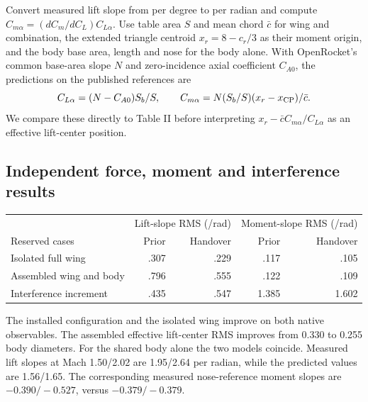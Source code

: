Convert measured lift slope from per degree to per radian and compute $C_{m\alpha}=(dC_m/dC_L)C_{L\alpha}$. Use table area $S$ and mean chord $\bar c$ for wing and combination, the extended triangle centroid $x_r=8-c_r/3$ as their moment origin, and the body base area, length and nose for the body alone. With OpenRocket's common base-area slope $N$ and zero-incidence axial coefficient $C_{A0}$, the predictions on the published references are
\[
 C_{L\alpha}=(N-C_{A0})S_b/S,\qquad
 C_{m\alpha}=N(S_b/S)(x_r-x_{\rm CP})/\bar c .
\]
We compare these directly to Table II before interpreting $x_r-\bar c C_{m\alpha}/C_{L\alpha}$ as an effective lift-center position.
\clearpage\subsection*{Independent force, moment and interference results}
\begin{center}\small\begin{tabular}{lrrrr}\toprule
&\multicolumn{2}{c}{Lift-slope RMS (/rad)}&\multicolumn{2}{c}{Moment-slope RMS (/rad)}\\
Reserved cases & Prior & Handover & Prior & Handover\\\midrule
Isolated full wing &.307&.229&.117&.105\\
Assembled wing and body &.796&.555&.122&.109\\
Interference increment &.435&.547&1.385&1.602\\\bottomrule\end{tabular}\end{center}
The installed configuration and the isolated wing improve on both native observables. The assembled effective lift-center RMS improves from 0.330 to 0.255 body diameters. For the shared body alone the two models coincide. Measured lift slopes at Mach 1.50/2.02 are 1.95/2.64 per radian, while the predicted values are 1.56/1.65. The corresponding measured nose-reference moment slopes are $-0.390/-0.527$, versus $-0.379/-0.379$.

